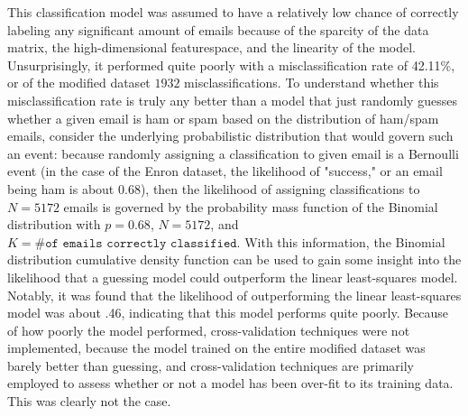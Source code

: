 \documentclass{article}
\begin{document}
This classification model was assumed to have a relatively low chance of correctly labeling any significant amount of emails because of the sparcity of the data matrix, the high-dimensional featurespace, and the linearity of the model. Unsurprisingly, it performed quite poorly with a misclassification rate of 42.11\%, or of the modified dataset $1932$ misclassifications. To understand whether this misclassification rate is truly any better than a model that just randomly guesses whether a given email is ham or spam based on the distribution of ham/spam emails, consider the underlying probabilistic distribution that would govern such an event: because randomly assigning a classification to given email is a Bernoulli event (in the case of the Enron dataset, the likelihood of "success," or an email being ham is about $0.68$), then the likelihood of assigning classifications to $N = 5172$ emails is governed by the probability mass function of the Binomial distribution with $p = 0.68$, $N = 5172$, and $K = \texttt{\# of emails correctly classified}$. With this information, the Binomial distribution cumulative density function can be used to gain some insight into the likelihood that a guessing model could outperform the linear least-squares model. Notably, it was found that the likelihood of outperforming the linear least-squares model was about .46, indicating that this model performs quite poorly. Because of how poorly the model performed, cross-validation techniques were not implemented, because the model trained on the entire modified dataset was barely better than guessing, and cross-validation techniques are primarily employed to assess whether or not a model has been over-fit to its training data. This was clearly not the case.
\end{document}
